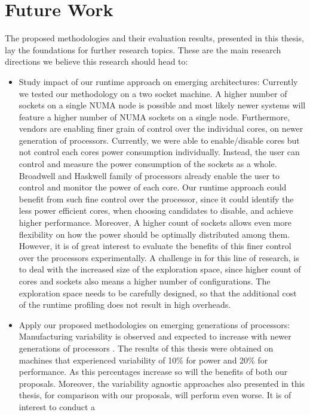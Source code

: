 \section{Future Work}
The proposed methodologies and their evaluation results, presented in this thesis, lay the
foundations for further research topics.  These are the main research directions we
believe this research should head to:
\begin{itemize}
	\item Study impact of our runtime approach on emerging architectures:  Currently we
tested our methodology on a two socket machine.  A higher number of sockets on a single
NUMA node is possible and most likely newer systems will feature a higher number of NUMA
sockets on a single node.  Furthermore, vendors are enabling finer grain of control over
the individual cores, on newer generation of processors.  Currently, we were able to
enable/disable cores but not control each cores power consumption individually.  Instead,
the user can control and measure the power consumption of the sockets as a whole.
Broadwell and Haskwell family of processors already enable the user to control and monitor
the power of each core.  Our runtime approach could benefit from such fine control over
the processor, since it could identify the less power efficient cores, when choosing
candidates to disable, and achieve higher performance.  Moreover, A higher count of
sockets allows even more flexibility on how the power should be optimally distributed
among them.  However, it is of great interest to evaluate the benefits of this finer
control over the processors experimentally.  A challenge in for this line of research, is
to deal with the increased size of the exploration space, since higher count of cores and
sockets also means a higher number of configurations.  The exploration space needs to be
carefully designed, so that the additional cost of the runtime profiling does not result
in high overheads.
	\item Apply our proposed methodologies on emerging generations of processors:
Manufacturing variability is observed and expected to increase with newer generations of
processors \cite{Marathe:2017:ESP:3149412.3149421}.  The results of this thesis were
obtained on machines that experienced variability of 10\% for power and 20\% for
performance.  As this percentages increase so will the benefits of both our proposals.
Moreover, the variability agnostic approaches also presented in this thesis, for
comparison with our proposals, will perform even worse.  It is of interest to conduct a

\end{itemize}
